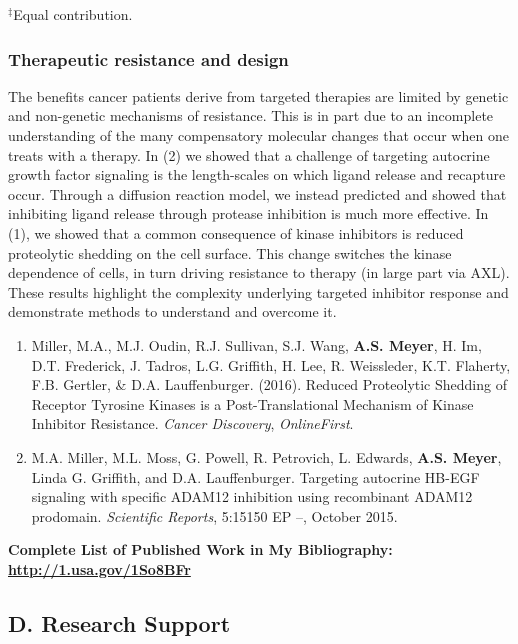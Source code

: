 \documentclass[12pt]{article}
\begin{document}
\noindent $^\ddag$Equal contribution.


\subsubsection{Therapeutic resistance and design} %

The benefits cancer patients derive from targeted therapies are limited by genetic and non-genetic mechanisms of resistance. This is in part due to an incomplete understanding of the many compensatory molecular changes that occur when one treats with a therapy. In (2) we showed that a challenge of targeting autocrine growth factor signaling is the length-scales on which ligand release and recapture occur. Through a diffusion reaction model, we instead predicted and showed that inhibiting ligand release through protease inhibition is much more effective. In (1), we showed that a common consequence of kinase inhibitors is reduced proteolytic shedding on the cell surface. This change switches the kinase dependence of cells, in turn driving resistance to therapy (in large part via AXL). These results highlight the complexity underlying targeted inhibitor response and demonstrate methods to understand and overcome it.

\begin{enumerate}
  \item Miller, M.A., M.J. Oudin, R.J. Sullivan, S.J. Wang, \textbf{A.S. Meyer}, H. Im, D.T. Frederick, J. Tadros, L.G. Griffith, H. Lee, R. Weissleder, K.T. Flaherty, F.B. Gertler, \& D.A. Lauffenburger. (2016). Reduced Proteolytic Shedding of Receptor Tyrosine Kinases is a Post-Translational Mechanism of Kinase Inhibitor Resistance. \emph{Cancer Discovery}, \emph{OnlineFirst}.
  \item M.A. Miller, M.L. Moss, G. Powell, R. Petrovich, L. Edwards, \textbf{A.S. Meyer}, Linda G. Griffith, and D.A. Lauffenburger. Targeting autocrine HB-EGF signaling with specific ADAM12 inhibition using recombinant ADAM12 prodomain. \emph{Scientific Reports}, 5:15150 EP --, October 2015.
\end{enumerate}

\textbf{Complete List of Published Work in My Bibliography: \url{http://1.usa.gov/1So8BFr}}





\cleardoublepage

\subsection{D. Research Support}
\end{document}
